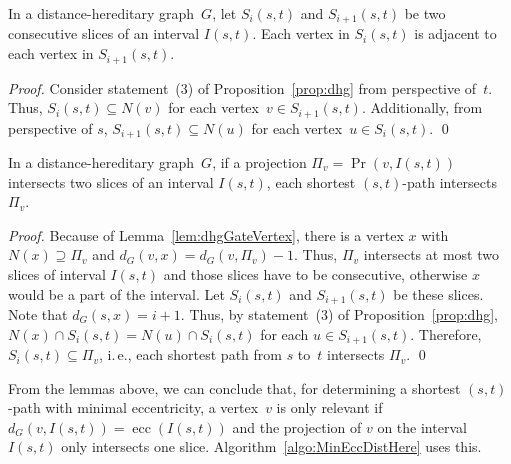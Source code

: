 \documentclass[10pt]{llncs}
\makeatletter
\newcommand{\ie}{i.\,e.\@ifnextchar{,}{}{~}}
\DeclareMathOperator{\ecc}{ecc}
\makeatother
\begin{document}
\begin{lemma}
    \label{lem:dhgSliceJoin}
In a distance-hereditary graph~$G$, let $S_i(s,t)$ and $S_{i+1}(s,t)$ be two consecutive slices of an interval $I(s,t)$. 
Each vertex in $S_i(s,t)$ is adjacent to each vertex in $S_{i+1}(s,t)$.
\end{lemma}

\begin{proof}
Consider statement~(3) of Proposition~\ref{prop:dhg} from perspective of~$t$.
Thus, $S_i(s,t) \subseteq N(v)$ for each vertex~$v \in S_{i+1}(s,t)$. 
Additionally, from perspective of $s$, $S_{i+1}(s,t) \subseteq N(u)$ for each vertex~$u \in S_{i}(s,t)$.
\qed
\end{proof}

\begin{lemma}
    \label{lem:dhgProjSliceInter}
In a distance-hereditary graph~$G$, if a projection $\Pi_v = \Pr(v, I(s,t))$ intersects two slices of an interval $I(s,t)$, each shortest $(s,t)$-path intersects $\Pi_v$.
\end{lemma}

\begin{proof}
Because of Lemma~\ref{lem:dhgGateVertex}, there is a vertex $x$ with $N(x) \supseteq \Pi_v$ and $d_G(v,x) = d_G(v, \Pi_v) - 1$. 
Thus, $\Pi_v$ intersects at most two slices of interval $I(s,t)$ and those slices have to be consecutive, otherwise $x$ would be a part of the interval.
Let $S_i(s,t)$ and $S_{i+1}(s,t)$ be these slices. 
Note that $d_G(s, x) = i + 1$. 
Thus, by statement~(3) of Proposition~\ref{prop:dhg}, $N(x) \cap S_i(s,t) = N(u) \cap S_i(s,t)$ for each $u \in S_{i+1}(s,t)$. 
Therefore, $S_i(s,t) \subseteq \Pi_v$, \ie, each shortest path from $s$ to~$t$ intersects $\Pi_v$.
\qed
\end{proof}

From the lemmas above, we can conclude that, for determining a shortest $(s,t)$-path with minimal eccentricity, a vertex~$v$ is only relevant if $d_G(v, I(s,t)) = \ecc(I(s,t))$ and the projection of $v$ on the interval $I(s,t)$ only intersects one slice.
Algorithm~\ref{algo:MinEccDistHere} uses this.
\end{document}
